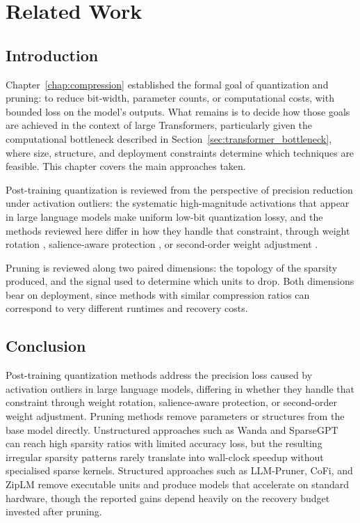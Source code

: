 \chapter{Related Work}
\label{chap:related_work}

\section{Introduction}

Chapter~\ref{chap:compression} established the formal goal of quantization and pruning: to reduce bit-width, parameter counts, or computational costs, with bounded loss on the model's outputs. What remains is to decide how those goals are achieved in the context of large Transformers, particularly given the computational bottleneck described in Section~\ref{sec:transformer_bottleneck}, where size, structure, and deployment constraints determine which techniques are feasible. This chapter covers the main approaches taken.

Post-training quantization is reviewed from the perspective of precision reduction under activation outliers: the systematic high-magnitude activations that appear in large language models make uniform low-bit quantization lossy, and the methods reviewed here differ in how they handle that constraint, through weight rotation \cite{ashkboos2024quarot}, salience-aware protection \cite{lin2024awq}, or second-order weight adjustment \cite{frantar2022gptq}.

Pruning is reviewed along two paired dimensions: the topology of the sparsity produced, and the signal used to determine which units to drop. Both dimensions bear on deployment, since methods with similar compression ratios can correspond to very different runtimes and recovery costs.





\section{Conclusion}

Post-training quantization methods address the precision loss caused by activation outliers in large language models, differing in whether they handle that constraint through weight rotation, salience-aware protection, or second-order weight adjustment. Pruning methods remove parameters or structures from the base model directly. Unstructured approaches such as Wanda and SparseGPT can reach high sparsity ratios with limited accuracy loss, but the resulting irregular sparsity patterns rarely translate into wall-clock speedup without specialised sparse kernels. Structured approaches such as LLM-Pruner, CoFi, and ZipLM remove executable units and produce models that accelerate on standard hardware, though the reported gains depend heavily on the recovery budget invested after pruning.

